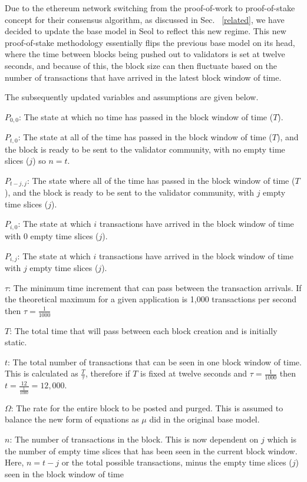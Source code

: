 \documentclass[conference]{IEEEtran}
\begin{document}
Due to the ethereum network switching from the proof-of-work to proof-of-stake 
concept for their consensus algorithm, as discussed in Sec. ~\ref{related}, we have decided to update
the base model in Seol\cite{2020_ACM_Seol} to reflect this new regime. This 
new proof-of-stake methodology essentially flips the previous base model on its 
head, where the time between blocks being pushed out to validators is set at twelve 
seconds, and because of this, the block size can then fluctuate based 
on the number of transactions that have arrived in the latest block window of time. 

The subsequently updated variables and assumptions are given below. 

$P_{0,0}$: The state at which no time has passed in the block window of time ($T$). 

$P_{t,0}$: The state at all of the time has passed in the block window of time ($T$), and
the block is ready to be sent to the validator community, with no empty time slices ($j$) so 
$n = t$. 

$P_{t-j,j}$: The state where all of the time has passed in the block window of time ($T$), and
the block is ready to be sent to the validator community, with $j$ empty time slices ($j$). 

$P_{i,0}$: The state at which $i$ transactions have arrived in the 
block window of time with 0 empty time slices ($j$). 

$P_{i,j}$: The state at which $i$ transactions have arrived in the 
block window of time with $j$ empty time slices ($j$). 

$\tau$: The minimum time increment that can pass between the 
transaction arrivals. If the theoretical maximum for a given application is 1,000 transactions 
per second then $\tau = \frac{1}{1000}$

$T$: The total time that will pass between each block creation and is initially static.

$t$: The total number of transactions that can be seen in one block window of time.
This is calculated as $\frac{T}{\tau}$, therefore if $T$ is fixed at twelve seconds and
$\tau=\frac{1}{1000}$ then $t=\frac{12}{\frac{1}{1000}}=12,000$. 

$\Omega$: The rate for the entire block to be posted and purged. This is assumed
to balance the new form of equations as $\mu$ did in the original base model.

$n$: The number of transactions in the block. This is now dependent on $j$ which is
the number of empty time slices that has been seen in the current block window. Here, 
$n=t - j$ or the total possible transactions, minus the empty time slices ($j$) seen in the
block window of time
\end{document}
